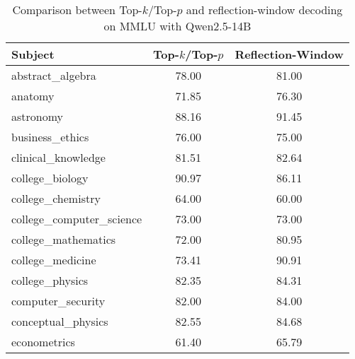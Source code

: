 \begingroup
\renewcommand{\arraystretch}{1}
\begin{table}[t]
    \caption{Comparison between Top-$k$/Top-$p$ and reflection-window decoding on MMLU with Qwen2.5-14B}
    \label{tab:decoding_comparison_qwen}
    \centering
    \footnotesize
    \begin{tabular}{L{0.35}C{0.20}C{0.20}}
        \toprule
        \textbf{Subject}                        & \textbf{Top-$k$/Top-$p$} & \textbf{Reflection-Window} \\
        \midrule
        abstract\_algebra                       & 78.00                    & 81.00                      \\
        anatomy                                 & 71.85                    & 76.30                      \\
        astronomy                               & 88.16                    & 91.45                      \\
        business\_ethics                        & 76.00                    & 75.00                      \\
        clinical\_knowledge                     & 81.51                    & 82.64                      \\
        college\_biology                        & 90.97                    & 86.11                      \\
        college\_chemistry                      & 64.00                    & 60.00                      \\
        college\_computer\_science              & 73.00                    & 73.00                      \\
        college\_mathematics                    & 72.00                    & 80.95                      \\
        college\_medicine                       & 73.41                    & 90.91                      \\
        college\_physics                        & 82.35                    & 84.31                      \\
        computer\_security                      & 82.00                    & 84.00                      \\
        conceptual\_physics                     & 82.55                    & 84.68                      \\
        econometrics                            & 61.40                    & 65.79                      \\

\end{tabular}
\end{table}
